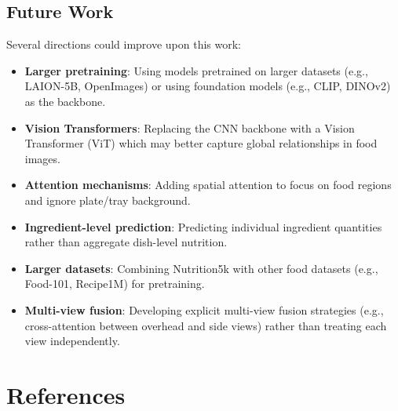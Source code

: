 \documentclass[11pt,a4paper]{article}
\begin{document}
\subsection{Future Work}

Several directions could improve upon this work:
\begin{itemize}
  \item \textbf{Larger pretraining}: Using models pretrained on larger datasets (e.g., LAION-5B, OpenImages) or using foundation models (e.g., CLIP, DINOv2) as the backbone.
  \item \textbf{Vision Transformers}: Replacing the CNN backbone with a Vision Transformer (ViT) which may better capture global relationships in food images.
  \item \textbf{Attention mechanisms}: Adding spatial attention to focus on food regions and ignore plate/tray background.
  \item \textbf{Ingredient-level prediction}: Predicting individual ingredient quantities rather than aggregate dish-level nutrition.
  \item \textbf{Larger datasets}: Combining Nutrition5k with other food datasets (e.g., Food-101, Recipe1M) for pretraining.
  \item \textbf{Multi-view fusion}: Developing explicit multi-view fusion strategies (e.g., cross-attention between overhead and side views) rather than treating each view independently.
\end{itemize}

\section{References}
\label{sec:references}
\end{document}
